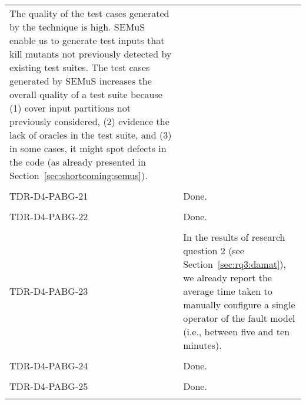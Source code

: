 \begin{longtable}{|p{2cm}|p{12cm}|@{}}
\begin{minipage}{12cm}
The quality of the test cases generated by the technique is high. SEMuS enable us to generate test inputs that kill mutants not previously detected by existing test suites. The test cases generated by SEMuS increases the overall quality of a test suite because (1) cover input partitions not previously considered, (2) evidence the lack of oracles in the test suite, and (3) in some cases, it might spot defects in the code (as already presented in Section~\ref{sec:shortcoming:semus}).
\end{minipage}\\
\\
\hline
TDR-D4-PABG-21&
\begin{minipage}{12cm}
Done.
\end{minipage}\\
\\
\hline
TDR-D4-PABG-22&
\begin{minipage}{12cm}
Done.
\end{minipage}\\
\\
\hline
TDR-D4-PABG-23&
\begin{minipage}{12cm}
In the results of research question 2 (see Section~\ref{sec:rq3:damat}), we already report the average time taken to manually configure a single operator of the fault model (i.e., between five and ten minutes).
\end{minipage}\\
\\
\hline
TDR-D4-PABG-24&
\begin{minipage}{12cm}
Done.
\end{minipage}\\
\\
\hline
TDR-D4-PABG-25&
\begin{minipage}{12cm}
Done.
\end{minipage}\\
\\
\hline
\end{longtable}
\normalsize

\clearpage
